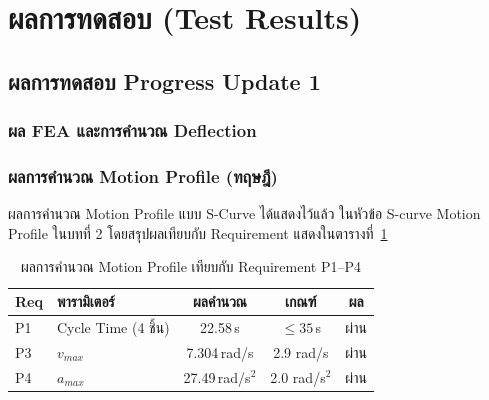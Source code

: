 
\section{ผลการทดสอบ (Test Results)}
\label{sec:test_results}

\subsection{ผลการทดสอบ Progress Update 1}
\label{subsec:test_results_p1}

\subsubsection{ผล FEA และการคำนวณ Deflection}
\label{subsubsec:fea_deflection_results}

\begin{table}[H]
  \centering
  \caption{ผล FEA เทียบกับเกณฑ์ M3}
  \label{tab:fea_p1}
\end{table}

\subsubsection{ผลการคำนวณ Motion Profile (ทฤษฎี)}
\label{subsubsec:theoretical_motion_profile}

ผลการคำนวณ Motion Profile แบบ S-Curve ได้แสดงไว้แล้ว
ในหัวข้อ S-curve Motion Profile ในบทที่ 2
โดยสรุปผลเทียบกับ Requirement แสดงในตารางที่~\ref{tab:motion_p1_check}

\begin{table}[H]
  \centering
  \caption{ผลการคำนวณ Motion Profile เทียบกับ Requirement P1--P4}
  \label{tab:motion_p1_check}
  \begin{tabular}{llccc}
    \toprule
    Req & พารามิเตอร์ & ผลคำนวณ & เกณฑ์ & ผล \\
    \midrule
    P1 & Cycle Time (4 ชิ้น) & 22.58\,s & $\leq 35$\,s & ผ่าน \\
    P3 & $v_{max}$            & 7.304\,rad/s & 2.9 rad/s & ผ่าน \\
    P4 & $a_{max}$            & 27.49\,rad/s$^2$ & 2.0 rad/s$^2$ & ผ่าน \\
    \bottomrule
  \end{tabular}
\end{table}

